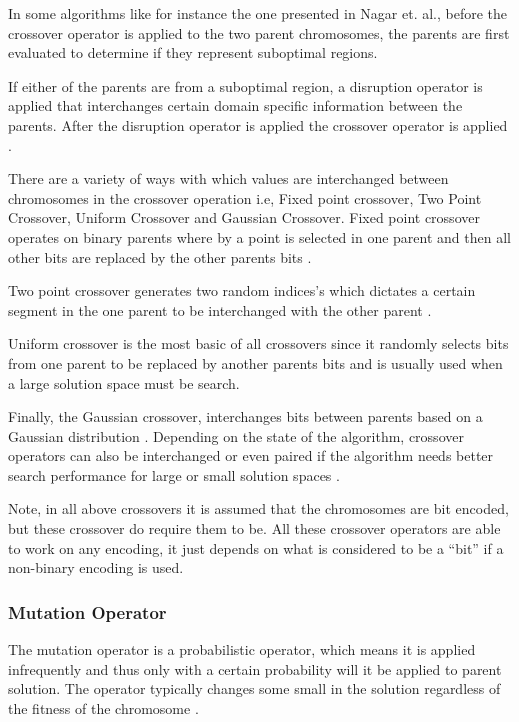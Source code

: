 In some algorithms like for instance the one presented in Nagar et. al., before the crossover operator is applied to the two parent chromosomes, the parents are first evaluated to determine if they represent suboptimal regions\cite{CombinedBranchBoundGA}.

If either of the parents are from a suboptimal region, a disruption operator is applied that interchanges certain domain specific information between the parents. After the disruption operator is applied the crossover operator is applied \cite{CombinedBranchBoundGA}.

There are a variety of ways with which values are interchanged between chromosomes in the crossover operation i.e, Fixed point crossover, Two Point Crossover, Uniform Crossover and Gaussian Crossover. Fixed point crossover operates on binary parents where by a point is selected in one parent and then all other bits are replaced by the other parents bits \cite{HumanPassiveGA}. 

Two point crossover generates two random indices's which dictates a certain segment in the one parent to be interchanged with the other parent \cite{ConstrainedGA}. 

Uniform crossover is the most basic of all crossovers since it randomly selects bits from one parent to be replaced by another parents bits and is usually used when a large solution space must be search\cite{ParallelGASA,GeostatisticalGA}. 

Finally, the Gaussian crossover, interchanges bits between parents based on a Gaussian distribution \cite{ParallelGASA,GeostatisticalGA}. Depending on the state of the algorithm, crossover operators can also be interchanged or even paired if the algorithm needs better search performance for large or small solution spaces \cite{HetergeneousGA,ParallelGASA}.

Note, in all above crossovers it is assumed that the chromosomes are bit encoded, but these crossover do require them to be. All these crossover operators are able to work on any encoding, it just depends on what is considered to be a ``bit'' if a non-binary encoding is used. 

\subsubsection{Mutation Operator}
The mutation operator is a probabilistic operator, which means it is applied infrequently and thus only with a certain probability will it be applied to parent solution. The operator typically changes some small in the solution regardless of the fitness of the chromosome \cite{HybridBaldwinGA,HumanPassiveGA}.

